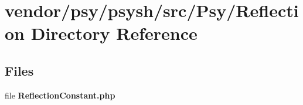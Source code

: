 \section{vendor/psy/psysh/src/\+Psy/\+Reflection Directory Reference}
\label{dir_077c1ccad9d5eca8ce50c6694fc5caa9}
\subsection*{Files}
\begin{DoxyCompactItemize}
\item 
file {\bf Reflection\+Constant.\+php}
\end{DoxyCompactItemize}
